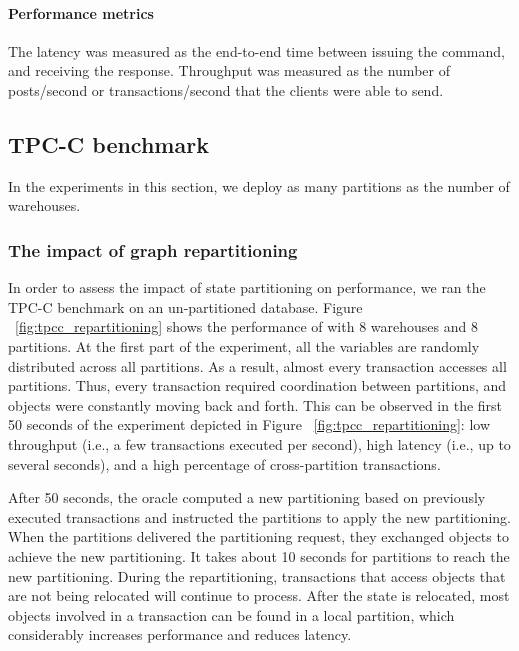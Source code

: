 \paragraph*{Performance metrics}
The latency was measured as the end-to-end time between issuing the command, and
receiving the response.  Throughput was measured as the number of posts/second
or transactions/second that the clients were able to send.

\subsection{TPC-C benchmark}
\label{sec:dynastar-evaluation:tpc-c}

In the experiments in this section, we deploy as many partitions as the number
of warehouses.

\subsubsection{The impact of graph repartitioning}
In order to assess the impact of state partitioning on performance, we ran the
TPC-C benchmark on an un-partitioned database.  Figure
~\ref{fig:tpcc_repartitioning} shows the performance of \dynastar with 8
warehouses and 8 partitions. At the first part of the experiment, all the
variables are randomly distributed across all partitions. As a result, almost
every transaction accesses all partitions. Thus, every transaction required
coordination between partitions, and objects were constantly moving back and
forth. This can be observed in the first 50 seconds of the experiment depicted
in Figure ~\ref{fig:tpcc_repartitioning}: low throughput (i.e., a few
transactions executed per second), high latency (i.e., up to several seconds),
and a high percentage of cross-partition transactions.

After 50 seconds, the oracle computed a new partitioning based on previously
executed transactions and instructed the partitions to apply the new
partitioning. When the partitions delivered the partitioning request, they
exchanged objects to achieve the new partitioning. It takes about 10 seconds for
partitions to reach the new partitioning. During the repartitioning,
transactions that access objects that are not being relocated will continue to
process. After the state is relocated, most objects involved in a transaction
can be found in a local partition, which considerably increases performance and
reduces latency.

